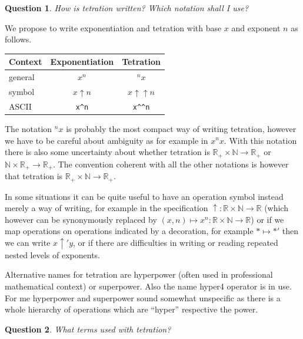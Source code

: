 \documentclass[12pt]{article}
\newtheorem{question}{Question}
\theoremstyle{definition}
\newcommand{\N}{\mathbb{N}}
\newcommand{\R}{\mathbb{R}}
\newcommand{\RP}{\mathbb{R}_+}
\newcommand{\tothe}{\uparrow}
\newcommand{\tetr}{\uparrow\uparrow}
\newcommand{\tet}[2]{{{}^{#2}{#1}}}
\begin{document}
\begin{question}
How is tetration written? Which notation shall I use?
\end{question}
We propose to write exponentiation and tetration with base $x$ and
exponent $n$ as follows.
\begin{center}\begin{tabular}{l|c|c}
  Context & Exponentiation & Tetration\\\hline
  general & $x^n$ & $\tet{x}{n}$\\\hline
  symbol & $x\tothe n$ & $x\tetr n$\\\hline
  ASCII & \verb$x^n$ & \verb$x^^n$
\end{tabular}\end{center}

The notation $\tet{x}{n}$ is probably the most compact way of writing
tetration, however we have to be careful about ambiguity as for
example in $x\tet{x}{n}$. With this notation there is also some
uncertainty about whether tetration is $\RP\times\N\to\RP$ or
$\N\times\RP\to\RP$. The convention coherent with all the other
notations is however that tetration is $\RP\times\N\to\RP$.

In some situations it can be quite useful to have an operation symbol
instead merely a way of writing, for example in the specification
$\uparrow\colon \R\times\N\to\R$ (which however can be synonymously 
replaced by $(x,n)\mapsto x^n\colon\R\times\N\to \R$) or if we map
operations on operations indicated by a decoration, for example
$\ast\mapsto \ast'$ then we can write $x\uparrow'y$, or if there are
difficulties in writing or reading repeated nested levels of
exponents.

Alternative names for tetration are hyperpower (often used in
professional mathematical context) or superpower. Also the name hyper4
operator is in use. For me hyperpower and superpower sound somewhat
unspecific as there is a whole hierarchy of operations which are ``hyper''
respective the power.

\begin{question}
What terms used with tetration?
\end{question}
\end{document}
